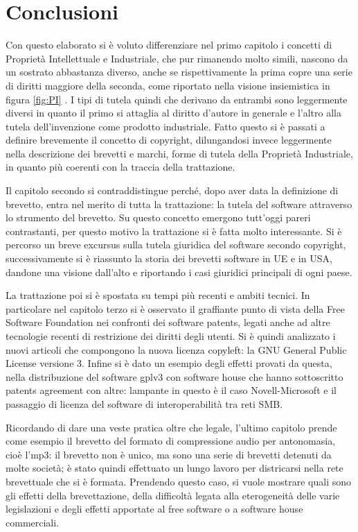  \chapter{Conclusioni}

Con questo elaborato si è voluto differenziare nel primo capitolo i concetti di Proprietà Intellettuale e Industriale, che pur rimanendo molto simili, nascono da un sostrato abbastanza diverso, anche se rispettivamente la prima copre una serie di diritti maggiore della seconda, come riportato nella visione insiemistica in figura \ref{fig:PI} . I tipi di tutela quindi che derivano da entrambi sono leggermente diversi in quanto il primo si attaglia al diritto d'autore in generale e l'altro alla tutela dell'invenzione come prodotto industriale. Fatto questo si è passati a definire brevemente il concetto di copyright, dilungandosi invece leggermente nella descrizione dei brevetti e marchi, forme di tutela della Proprietà Industriale, in quanto più coerenti con la traccia della trattazione.

Il capitolo secondo si contraddistingue perché, dopo aver data la definizione di brevetto, entra nel merito di tutta la trattazione: la tutela del software attraverso lo strumento del brevetto. Su questo concetto emergono tutt'oggi pareri contrastanti, per questo motivo la trattazione si è fatta molto interessante. Si è percorso un breve excursus sulla tutela giuridica del software secondo copyright, successivamente si è riassunto la storia dei brevetti software in UE e in USA, dandone una visione dall'alto e riportando i casi giuridici principali di ogni paese.

La trattazione poi si è spostata su tempi più recenti e ambiti tecnici. In particolare nel capitolo terzo si è osservato il graffiante punto di vista della Free Software Foundation nei confronti dei software patents, legati anche ad altre tecnologie recenti di restrizione dei diritti degli utenti. Si è quindi analizzato i nuovi articoli che compongono la nuova licenza copyleft: la GNU General Public License versione 3.
Infine si è dato un esempio degli effetti provati da questa, nella distribuzione del software gplv3 con software house che hanno sottoscritto patents agreement con altre: lampante in questo è il caso Novell-Microsoft e il passaggio di licenza del software di interoperabilità tra reti SMB.

Ricordando di dare una veste pratica oltre che legale, l'ultimo capitolo prende come esempio il brevetto del formato di compressione audio per antonomasia, cioè l'mp3: il brevetto non è unico, ma sono una serie di brevetti detenuti da molte società; è stato quindi effettuato un lungo lavoro per districarsi nella rete brevettuale che si è formata. Prendendo questo caso, si vuole mostrare quali sono gli effetti della brevettazione, della difficoltà legata alla eterogeneità delle varie legislazioni e degli effetti apportate al free software o a software house commerciali.

